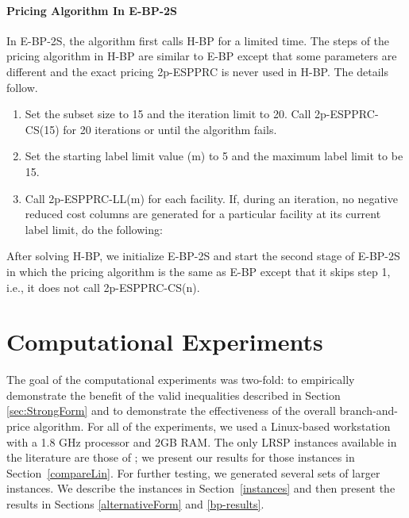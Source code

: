 \documentclass[11pt]{article}
\begin{document}
\paragraph{Pricing Algorithm In E-BP-2S}
In E-BP-2S, the algorithm first calls H-BP for a limited time. 
The steps of the pricing algorithm in H-BP are similar to E-BP except that some parameters 
are different and the exact pricing 2p-ESPPRC is never used in H-BP.  The details follow. 
\begin{enumerate}
\item Set the subset size to 15 and the iteration limit to 20. 
Call 2p-ESPPRC-CS(15) for 20 iterations or until the algorithm fails. 
\item Set the starting label limit value (m) to 5 and the maximum label limit
to be 15.  
\item Call 2p-ESPPRC-LL(m) for each facility. If, during an iteration, no negative reduced 
cost columns are generated for a particular facility at its current label limit, 
do the following:
\end{enumerate}

After solving H-BP, we initialize E-BP-2S and start the second stage of E-BP-2S in which
the pricing algorithm is the same as E-BP except that it skips step 1, i.e., it does not call 
2p-ESPPRC-CS(n). 



\section{Computational Experiments}
\label{sec:results}
The goal of the computational experiments was two-fold: to empirically demonstrate 
the benefit of the valid inequalities described in Section \ref{sec:StrongForm}
and to demonstrate the effectiveness of the overall branch-and-price algorithm.
For all of the experiments, we used a Linux-based workstation with a 1.8 GHz processor
and 2GB RAM.  The only LRSP instances available in the literature are those of \citet{Lin};
we present our results for those instances in Section~\ref{compareLin}.  
For further testing, we generated several sets of larger instances.  
We describe the instances in Section~\ref{instances} and then 
present the results in Sections \ref{alternativeForm} and \ref{bp-results}.
\end{document}
